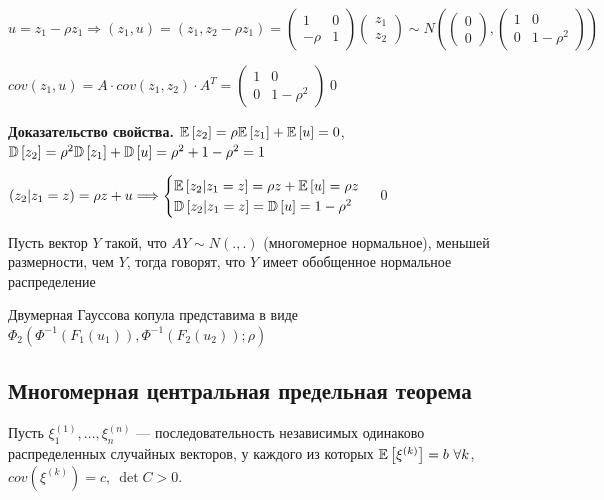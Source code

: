 \documentclass[a4paper, 10pt]{article}
\begin{document}
    \proof $u=z_1-\rho z_1\Longrightarrow (z_1, u)=(z_1, z_2-\rho z_1)=\begin{pmatrix}
        1&0\\
        -\rho & 1
    \end{pmatrix}\begin{pmatrix}
        z_1\\
        z_2
    \end{pmatrix}\sim N\left(\begin{pmatrix}
        0\\
        0
    \end{pmatrix},\begin{pmatrix}
        1&0\\
        0&1-\rho^2
    \end{pmatrix}\right)$

    $cov(z_1, u)=A\cdot cov(z_1,z_2)\cdot A^T=\begin{pmatrix}
        1&0\\
        0&1-\rho^2
    \end{pmatrix}$\qed

    \textbf{Доказательство свойства.} $\mathbb{E}\left[z_2\right]=\rho\mathbb{E}\left[z_1\right]+\mathbb{E}\left[u\right]=0$, $\mathbb{D}\left[z_2\right]=\rho^2\mathbb{D}\left[z_1\right]+\mathbb{D}\left[u\right]=\rho^2+1-\rho^2=1$

    $(z_2\vert z_1=z)=\rho z+u\Longrightarrow \begin{cases}
        \mathbb{E}\left[z_2\vert z_1=z\right]=\rho z+\mathbb{E}\left[u\right]=\rho z\\
        \mathbb{D}\left[z_2\vert z_1=z\right]=\mathbb{D}\left[u\right]=1-\rho^2
    \end{cases}$\qed

    \comment Пусть вектор $Y$ такой, что $AY\sim N(.,.)$ (многомерное нормальное), меньшей размерности, чем $Y$, тогда говорят, что $Y$ имеет обобщенное нормальное распределение



\comment Двумерная Гауссова копула представима в виде $\Phi_2(\Phi^{-1}(F_1(u_1)),\Phi^{-1}(F_2(u_2));\rho)$


\subsection{Многомерная центральная предельная теорема}
\theorem Пусть $\xi^{(1)}_1,\ldots,\xi^{(n)}_n$ — последовательность независимых одинаково распределенных случайных векторов, у каждого из которых $\mathbb{E}\left[\xi^{(k)}\right]=b\ \forall k$, $cov(\xi^{(k)})=c,\ \det C>0$. 
\end{document}
